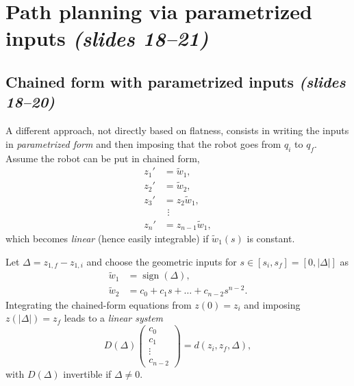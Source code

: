 \documentclass[11pt,a4paper]{article}
\def\boldsymbol#1{#1}%
\DeclareMathOperator{\sign}{sign}
\newcommand{\qi}{\boldsymbol{q}_i}
\newcommand{\qf}{\boldsymbol{q}_f}
\newcommand{\wwt}{\tilde w}
\theoremstyle{definition}
\theoremstyle{plain}
\theoremstyle{remark}
\begin{document}
\section{Path planning via parametrized inputs \emph{(slides 18--21)}}

\subsection{Chained form with parametrized inputs \emph{(slides 18--20)}}

A different approach, not directly based on flatness, consists in writing the inputs in \emph{parametrized form} and then
imposing that the robot goes from $\qi$ to $\qf$. Assume the robot can be put in chained form,
\begin{align}
z_1'&=\wwt_1,\nonumber\\
z_2'&=\wwt_2,\nonumber\\
z_3'&=z_2\wwt_1,\\
&\ \,\vdots\nonumber\\
z_n'&=z_{n-1}\wwt_1,\nonumber
\end{align}
which becomes \emph{linear} (hence easily integrable) if $\wwt_1(s)$ is constant.

Let $\Delta=z_{1,f}-z_{1,i}$ and choose the geometric inputs for $s\in[s_i,s_f]=[0,|\Delta|]$ as
\begin{align}
\wwt_1&=\sign(\Delta),\\
\wwt_2&=c_0+c_1s+\dots+c_{n-2}s^{n-2}.
\end{align}
Integrating the chained-form equations from $\boldsymbol z(0)=\boldsymbol z_i$ and imposing $\boldsymbol z(|\Delta|)=\boldsymbol z_f$ leads to a
\emph{linear system}
\begin{equation}
D(\Delta)\begin{pmatrix}c_0\\c_1\\\vdots\\c_{n-2}\end{pmatrix}=\boldsymbol d(\boldsymbol z_i,\boldsymbol z_f,\Delta),
\end{equation}
with $D(\Delta)$ invertible if $\Delta\ne0$.
\end{document}

